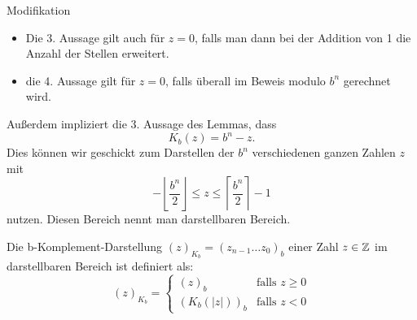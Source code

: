 \begin{remark} Modifikation 
\begin{itemize}
	\item Die 3. Aussage gilt auch für $z=0$, falls man dann bei der Addition von 1 die Anzahl der Stellen erweitert.
	\item die 4. Aussage gilt für $z=0$, falls überall im Beweis modulo $b^{n}$ gerechnet wird.
\end{itemize}
\end{remark}
Außerdem impliziert die 3. Aussage des Lemmas, dass 
\begin{equation}\label{eqn:komplement}
	K_b(z)=b^{n}-z \text{.}
\end{equation}
Dies können wir geschickt zum Darstellen der $b^{n}$ verschiedenen ganzen Zahlen $z$ mit 
\[
-\left\lfloor \frac{b^{n}}{2}\right\rfloor \le z \le \left\lceil \frac{b^{n}}{2}\right\rceil -1
\]
nutzen. Diesen Bereich nennt man darstellbaren Bereich.
\begin{definition}
	Die b-Komplement-Darstellung $(z)_{K_b} = (z_{n-1} \ldots z_0)_b$ einer Zahl $z \in  \mathbb{Z}$ im darstellbaren Bereich ist definiert als:
	\[
		(z)_{K_b}= \begin{cases}
			(z)_b & \text{falls } z \ge 0 \\
			\left( K_b(|z|) \right)_b & \text{falls } z<0
		\end{cases}
	\]
\end{definition}

